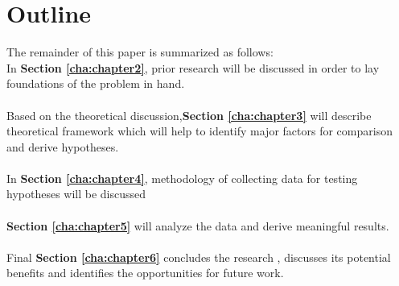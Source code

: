 \section{Outline\label{sec:outline}}

The remainder of this paper is summarized as follows:
\\
In \textbf{Section \ref{cha:chapter2}}, prior research will be discussed
in order to lay foundations of the problem in hand.
\\
\\
Based on the theoretical discussion,\textbf{Section \ref{cha:chapter3}} will describe theoretical framework which will help to identify major factors for comparison and derive hypotheses. 
\\
\\
In \textbf{Section \ref{cha:chapter4}}, methodology of collecting data for testing hypotheses will be
discussed
\\
\\
\textbf{Section \ref{cha:chapter5}} will analyze the data and derive meaningful results.
\\
\\
Final \textbf{Section \ref{cha:chapter6}} concludes the research , discusses its potential benefits and identifies the opportunities for future
work.
